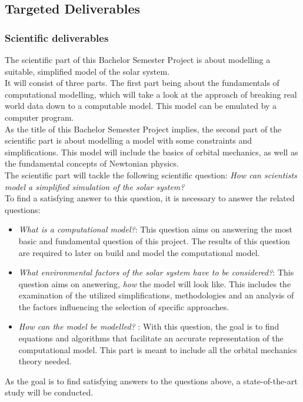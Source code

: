 \documentclass[conference,compsoc]{IEEEtran}
\begin{document}
\subsection{Targeted Deliverables}
\label{sec-deliverables}
\subsubsection{Scientific deliverables}
The scientific part of this Bachelor Semester Project is about modelling a suitable, simplified model of the solar system.\\
It will consist of three parts. The first part being about the fundamentals of computational modelling, which will take a look at the approach of breaking real world data down to a computable model. This model can be emulated by a computer program.\\
As the title of this Bachelor Semester Project implies, the second part of the scientific part is about modelling a model with some constraints and simplifications. This model will include the basics of orbital mechanics, as well as the fundamental concepts of Newtonian physics.\\ 
The scientific part will tackle the following scientific question: \emph{How can scientists model a simplified simulation of the solar system?} \\
To find a satisfying answer to this question, it is necessary to answer the related questions:
\begin{itemize}
	\item \emph{What is a computational model?}: This question aims on answering the most basic and fundamental question of this project. The results of this question are required to later on build and model the computational model.
	\item \emph{What environmental factors of the solar system have to be considered?}: This question aims on answering, \emph{how} the model will look like. This includes the examination of the utilized simplifications, methodologies and an analysis of the factors influencing the selection of specific approaches.
	\item \emph{How can the model be modelled? }: With this question, the goal is to find equations and algorithms that facilitate an accurate representation of the computational model. This part is meant to include all the orbital mechanics theory needed. 
\end{itemize}
As the goal is to find satisfying answers to the questions above, a state-of-the-art study will be conducted. 
\end{document}

